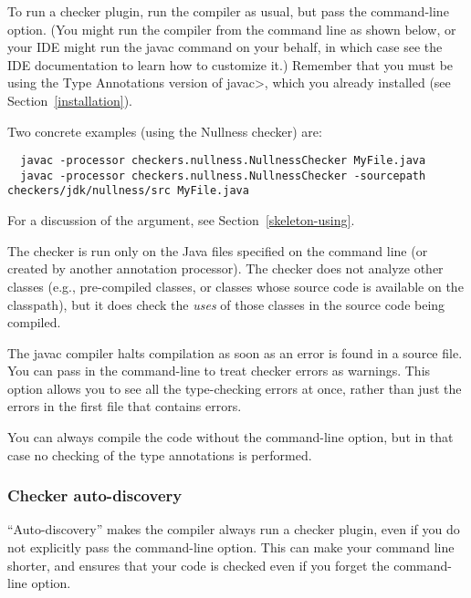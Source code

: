To run a checker plugin, run the compiler  as usual,
but pass the  command-line
option.
(You might run the compiler from the command line as shown below, or your
IDE might run the javac command on your behalf, in which case see the IDE
documentation to learn how to customize it.)
Remember that you must be using the
Type Annotations version of \<javac>, which you already installed (see Section~\ref{installation}).

Two concrete examples (using the Nullness checker) are:

\begin{smaller}
\begin{Verbatim}
  javac -processor checkers.nullness.NullnessChecker MyFile.java
  javac -processor checkers.nullness.NullnessChecker -sourcepath checkers/jdk/nullness/src MyFile.java
\end{Verbatim}
\end{smaller}

\noindent
For a discussion of the  argument, see
Section~\ref{skeleton-using}.

The checker is run only on the Java files specified on the command line (or
created by another annotation processor).
The checker does not analyze other classes (e.g., pre-compiled classes, or
classes whose source
code is available on the classpath), but it does check
the \emph{uses} of those classes in the source code being compiled.

The javac compiler halts compilation as soon as an error is found in a
source file.  You can pass  in the command-line to
treat checker errors as warnings.  This option allows you to see all
the type-checking errors at once, rather than just the errors in the first
file that contains errors.

You can always compile the code without the 
command-line option, but in that case no checking of the type
annotations is performed.

\subsubsection{Checker auto-discovery}

``Auto-discovery'' makes the  compiler always run a checker
plugin, even if you do not explicitly pass the 
command-line option.  This can make your command line shorter, and ensures
that your code is checked even if you forget the command-line option.

